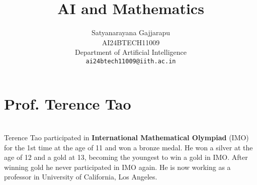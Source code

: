 \documentclass{article}
\title{AI and Mathematics}
\author{%
Satyanarayana Gajjarapu \\
AI24BTECH11009 \\
Department of Artificial Intelligence \\
\texttt{ai24btech11009@iith.ac.in} \\
}
\begin{document}
\maketitle
\section{Prof. Terence Tao}
\begin{paragraph}
\\
Terence Tao participated in \textbf{International Mathematical Olympiad} (IMO) for the 1st time at the age of 11 and won a bronze medal. He won a silver at the age of 12 and a gold at 13, becoming the youngest to win a gold in IMO. After winning gold he never participated in IMO again. He is now working as a professor in University of California, Los Angeles.
\end{paragraph}
\end{document}
